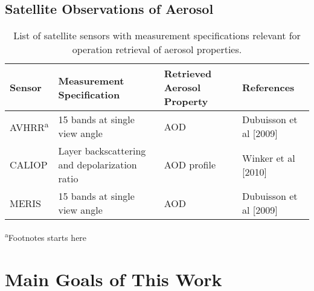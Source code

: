 \subsection{Satellite Observations of Aerosol}

\begin{table}[h]
  \small
  \caption{List of satellite sensors with measurement specifications 
  relevant for operation retrieval of aerosol properties.}
  \label{tab:satellites}
  \begin{tabular}{p{}p{}p{}p{}}\toprule
    Sensor & Measurement Specification  & Retrieved Aerosol Property & References \\ \midrule
    AVHRR\textsuperscript{a}  & 15 bands at single view angle & AOD & Dubuisson et al [2009] \\
    CALIOP & Layer backscattering and depolarization ratio & AOD profile & Winker et al [2010] \\
    MERIS  & 15 bands at single view angle & AOD & Dubuisson et al [2009] \\ \bottomrule
  \end{tabular}
   \textsuperscript{a}Footnotes starts here
\end{table}

\section{Main Goals of This Work}

